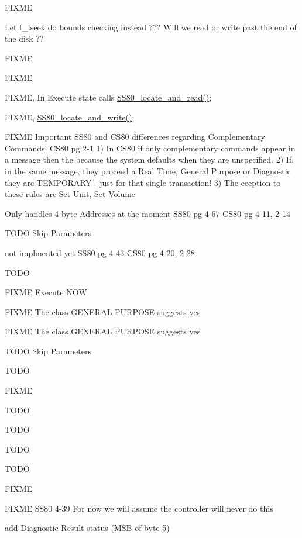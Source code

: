 \begin{DoxyRefList}
F\+I\+X\+ME  
\item[\label{todo__todo000058}%
\hypertarget{todo__todo000058}{}%
Global \hyperlink{ss80_8h_a0d2e3b28c642ea89fea6ff6f8ced5a3b}{S\+S80\+\_\+cmd\+\_\+seek} (void)]Let f\+\_\+lseek do bounds checking instead ??? Will we read or write past the end of the disk ??  
\item[\label{todo__todo000030}%
\hypertarget{todo__todo000030}{}%
Global \hyperlink{ss80_8h_a98c1da720b6dbe5ee9f13b914a913e17}{S\+S80\+\_\+\+Command\+\_\+\+State} (void)]F\+I\+X\+ME 

F\+I\+X\+ME 

F\+I\+X\+ME, In Execute state calls \hyperlink{ss80_8c_acad6de863f4566b55cb8860eb1ffd09c}{S\+S80\+\_\+locate\+\_\+and\+\_\+read()}; 

F\+I\+X\+ME, \hyperlink{ss80_8c_a41ef37ec5419463815401485cfcb62b1}{S\+S80\+\_\+locate\+\_\+and\+\_\+write()}; 

F\+I\+X\+ME Important S\+S80 and C\+S80 differences regarding Complementary Commands! C\+S80 pg 2-\/1 1) In C\+S80 if only complementary commands appear in a message then the because the system defaults when they are unspecified. 2) If, in the same message, they proceed a Real Time, General Purpose or Diagnostic they are T\+E\+M\+P\+O\+R\+A\+RY -\/ just for that single transaction! 3) The eception to these rules are Set Unit, Set Volume 

Only handles 4-\/byte Addresses at the moment S\+S80 pg 4-\/67 C\+S80 pg 4-\/11, 2-\/14 

T\+O\+DO Skip Parameters 

not implmented yet S\+S80 pg 4-\/43 C\+S80 pg 4-\/20, 2-\/28 

T\+O\+DO 

F\+I\+X\+ME Execute N\+OW 

F\+I\+X\+ME The class G\+E\+N\+E\+R\+AL P\+U\+R\+P\+O\+SE suggests yes 

F\+I\+X\+ME The class G\+E\+N\+E\+R\+AL P\+U\+R\+P\+O\+SE suggests yes 

T\+O\+DO Skip Parameters 

T\+O\+DO 

F\+I\+X\+ME 

T\+O\+DO 

T\+O\+DO 

T\+O\+DO 

T\+O\+DO  
\item[\label{todo__todo000026}%
\hypertarget{todo__todo000026}{}%
Global \hyperlink{ss80_8h_a46587aecd8aff545fb96ef5b308f28ff}{S\+S80\+\_\+init} (void)]F\+I\+X\+ME  
\item[\label{todo__todo000027}%
\hypertarget{todo__todo000027}{}%
Global \hyperlink{ss80_8h_acad6de863f4566b55cb8860eb1ffd09c}{S\+S80\+\_\+locate\+\_\+and\+\_\+read} (void)]F\+I\+X\+ME S\+S80 4-\/39 For now we will assume the controller will never do this  
\item[\label{todo__todo000028}%
\hypertarget{todo__todo000028}{}%
Global \hyperlink{ss80_8h_ac4c1287b3b8b6a51f5b79522c62d4cea}{S\+S80\+\_\+send\+\_\+status} (void)]add Diagnostic Result status (M\+SB of byte 5) 


\end{DoxyRefList}
